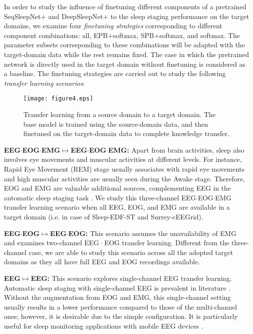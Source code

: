 \documentclass[journal,twoside,web]{ieeecolor}
\begin{document}
In order to study the influence of finetuning different components of a pretrained SeqSleepNet+ and DeepSleepNet+ to the sleep staging performance on the target domains, we examine four \emph{finetuning strategies} corresponding to different component combinations: all, EPB+softmax, SPB+softmax, and softmax. The parameter subsets corresponding to these combinations will be adapted with the target-domain data while the rest remains fixed. The case in which the pretrained network is directly used in the target domain without finetuning is considered as a baseline. The finetuning strategies are carried out to study the following \emph{transfer learning scenarios}:

\begin{figure} [!t]
	\centering
	\texttt{[image: figure4.eps]}
	\vspace{-0.15cm}
	\caption{Transfer learning from a source domain to a target domain. The base model is trained using the source-domain data, and then finetuned on the target-domain data to complete knowledge transfer.}
	\label{fig:sleep_transfer}
	\vspace{-0.25cm}
\end{figure}

{\bf EEG$\cdot$EOG$\cdot$EMG$\mapsto$EEG$\cdot$EOG$\cdot$EMG:} Apart from brain activities, sleep also involves eye movements and muscular activities at different levels. For instance, Rapid Eye Movement (REM) stage usually associates with rapid eye movements and high muscular activities are usually seen during the Awake stage. Therefore, EOG and EMG are valuable additional sources, complementing EEG in the automatic sleep staging task \cite{Stephansen2018,Mikkelsen2018, Chambon2018, Andreotti2018, Phan2019b}. We study this three-channel EEG$\cdot$EOG$\cdot$EMG transfer learning scenario when all EEG, EOG, and EMG are available in a target domain (i.e. in case of Sleep-EDF-ST and Surrey-cEEGrid).

{\bf EEG$\cdot$EOG$\mapsto$EEG$\cdot$EOG:} This scenario assumes the unavailability of EMG and examines two-channel EEG·EOG transfer learning. Different from the three-channel case, we are able to study this scenario across all the adopted target domains as they all have full EEG and EOG recordings available.

{\bf EEG$\mapsto$EEG:} This scenario explores single-channel EEG transfer learning. Automatic sleep staging with single-channel EEG is prevalent in literature \cite{Koley2012, Tsinalis2016b, phan2018c, phan2018d, Kuo2011, Phan2013}. Without the augmentation from EOG and EMG, this single-channel setting usually results in a lower performance compared to those of the multi-channel ones; however, it is desirable due to the simple configuration. It is particularly useful for sleep monitoring applications with mobile EEG devices \cite{Mikkelsen2019, Sterr2018}.
\end{document}
